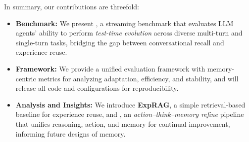 In summary, our contributions are threefold:
\begin{itemize}[itemsep=0pt,topsep=2pt,leftmargin=*]
    \item \textbf{Benchmark:} We present \method, a streaming benchmark that evaluates LLM agents' ability to perform \emph{test-time evolution} across diverse multi-turn and single-turn tasks, bridging the gap between conversational recall and experience reuse.
    \item \textbf{Framework:} We provide a unified evaluation framework with memory-centric metrics for analyzing adaptation, efficiency, and stability, and will release all code and configurations for reproducibility.
\item \textbf{Analysis and Insights:} We introduce \textbf{ExpRAG}, a simple retrieval-based baseline for experience reuse, and \textbf{\alg}, an \emph{action–think–memory refine} pipeline that unifies reasoning, action, and memory for continual improvement, informing future designs of memory.
\end{itemize}



